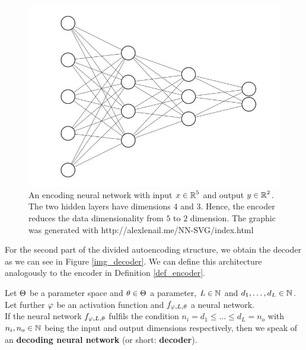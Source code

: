 \begin{figure}
\begin{center}
   \begin{minipage}[b]{0.9\linewidth}
      \includegraphics[width=\linewidth]{encoder}
      \caption{An encoding neural network with input $x\in \operatorname{\mathbb{R}}^5$ and output $y \in \operatorname{\mathbb{R}}^2$. The two hidden layers have dimensions $4$ and $3$. Hence, the encoder reduces the data dimensionality from $5$ to $2$ dimension. The graphic was generated with http://alexlenail.me/NN-SVG/index.html}\label{img_encoder}
	\end{minipage}
\end{center}
\end{figure}


For the second part of the divided autoencoding structure, we obtain the decoder as we can see in Figure \ref{img_decoder}. We can define this architecture analogously to the encoder in Definition \ref{def_encoder}.


\begin{definition}\label{def_decoder}
Let $\operatorname{\Theta}$ be a parameter space and $\theta \in \operatorname{\Theta}$ a parameter, $L\in \operatorname{\mathbb{N}}$ and $d_1,\ldots, d_L\in\operatorname{\mathbb{N}}$. Let further $\operatorname{\varphi}$ be an activation function and $f_{\operatorname{\varphi},L,\theta}$ a neural network.\\
If the neural network $f_{\operatorname{\varphi},L,\theta}$ fulfils the condition $n_i= d_1 \leq \ldots \leq d_L = n_o$ with $n_i, n_o \in \operatorname{\mathbb{N}}$ being the input and output dimensions respectively, then we speak of an \textbf{decoding neural network} (or short: \textbf{decoder}).
\end{definition}


